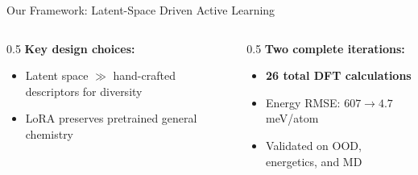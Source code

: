 \documentclass[aspectratio=169,10pt]{beamer}
\begin{document}
\begin{frame}{Our Framework: Latent-Space Driven Active Learning}
\begin{center}
{}
\end{center}
\vspace{0.15em}
\begin{columns}
  \begin{column}{0.5\textwidth}
    \textbf{Key design choices:}
    \begin{itemize}
      \item Latent space $\gg$ hand-crafted descriptors for diversity
      \item LoRA preserves pretrained general chemistry
    \end{itemize}
  \end{column}
  \begin{column}{0.5\textwidth}
    \textbf{Two complete iterations:}
    \begin{itemize}
      \item \textbf{26 total DFT calculations}
      \item Energy RMSE: $607 \to 4.7$\,meV/atom
      \item Validated on OOD, energetics, and MD
    \end{itemize}
  \end{column}
\end{columns}
\end{frame}
\end{document}
